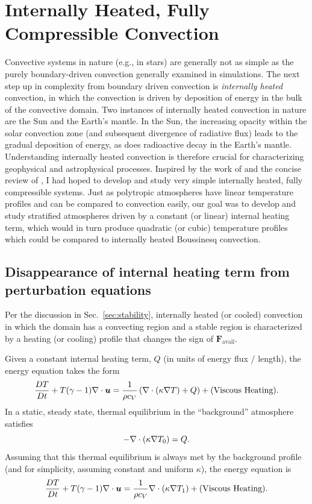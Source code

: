 \section{Internally Heated, Fully Compressible Convection}
\label{sec:internally_heated}
Convective systems in nature (e.g., in stars) are generally not as simple as the purely boundary-driven convection generally examined in simulations.
The next step up in complexity from boundary driven convection is \emph{internally heated} convection, in which the convection is driven by deposition of energy in the bulk of the convective domain.
Two instances of internally heated convection in nature are the Sun and the Earth's mantle.
In the Sun, the increasing opacity within the solar convection zone (and subsequent divergence of radiative flux) leads to the gradual deposition of energy, as does radioactive decay in the Earth's mantle.
Understanding internally heated convection is therefore crucial for characterizing geophysical and astrophysical processes.
Inspired by the work of \citet{goluskin&spiegel2012} and the concise review of \citet{goluskin2016}, I had hoped to develop and study very simple internally heated, fully compressible systems.
Just as polytropic atmospheres have linear temperature profiles and can be compared to \RB convection easily, our goal was to develop and study stratified atmospheres driven by a constant (or linear) internal heating term, which would in turn produce quadratic (or cubic) temperature profiles which could be compared to internally heated Boussinesq convection.

\subsection{Disappearance of internal heating term from perturbation equations}
Per the discussion in Sec.~\ref{sec:stability}, internally heated (or cooled) convection in which the domain has a convecting region and a stable region is characterized by a heating (or cooling) profile that changes the sign of $\bm{F}_{\text{avail}}$.

Given a constant internal heating term, $Q$ (in units of energy flux / length), the energy equation takes the form
\begin{equation}
\frac{D T}{Dt} + T(\gamma-1)\nabla\cdot\bm{u} = \frac{1}{\rho c_V}\left(\nabla\cdot\left( \kappa \nabla T\right) + Q\right) + \text{(Viscous Heating)}.
\end{equation}
In a static, steady state, thermal equilibrium in the ``background'' atmosphere satisfies 
\begin{equation}
-\nabla\cdot\left( \kappa \nabla T_0\right) = Q.
\end{equation}
Assuming that this thermal equilibrium is always met by the background profile (and for simplicity, assuming constant and uniform $\kappa$), the energy equation is
\begin{equation}
\frac{D T}{Dt} + T(\gamma-1)\nabla\cdot\bm{u} = \frac{1}{\rho c_V}\nabla\cdot\left( \kappa \nabla T_1\right) + \text{(Viscous Heating)}.
\label{eqn:energy_noheat}
\end{equation}

